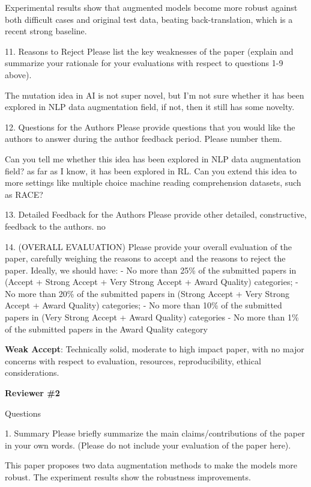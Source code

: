 \documentclass{article}
\begin{document}
Experimental results show that augmented models become more robust against both difficult cases and original test data, beating back-translation, which is a recent strong baseline.

11. {Reasons to Reject} Please list the key weaknesses of the paper (explain and summarize your rationale for your evaluations with respect to questions 1-9 above).

The mutation idea in AI is not super novel, but I'm not sure whether it has been explored in NLP data augmentation field, if not, then it still has some novelty.

12. {Questions for the Authors} Please provide questions that you would like the authors to answer during the author feedback period. Please number them.

Can you tell me whether this idea has been explored in NLP data augmentation field? as far as I know, it has been explored in RL. Can you extend this idea to more settings like multiple choice machine reading comprehension datasets, such as RACE?

13. {Detailed Feedback for the Authors} Please provide other detailed, constructive, feedback to the authors.
no

14. (OVERALL EVALUATION) Please provide your overall evaluation of the paper, 
carefully weighing the reasons to accept and the reasons to reject the paper. 
Ideally, we should have: - No more than 25\% of the submitted papers in 
(Accept + Strong Accept + Very Strong Accept + Award Quality) categories; 
- No more than 20\% of the submitted papers in (Strong Accept + 
Very Strong Accept + Award Quality) categories; - No more than 
10\% of the submitted papers in (Very Strong Accept + Award Quality) categories 
- No more than 1\% of the submitted papers in the Award Quality category

\textbf{Weak Accept}: Technically solid, moderate to high impact paper, with no major concerns with respect to evaluation, resources, reproducibility, ethical considerations.

\textbf{\Large{Reviewer \#2}}

Questions

1. {Summary} Please briefly summarize the main claims/contributions of the paper in your own words. (Please do not include your evaluation of the paper here).

This paper proposes two data augmentation methods to make the models more robust. The experiment results show the robustness improvements.
\end{document}
